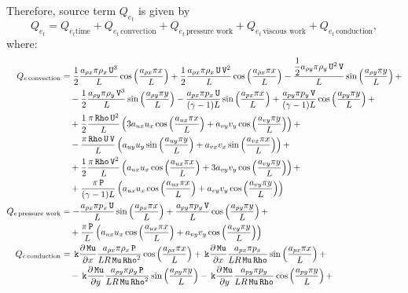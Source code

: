 \documentclass[10pt]{article}
\newcommand{\diff}[2] {\dfrac{\partial #1}{\partial #2}}
\newcommand{\Rho}{\,\mathtt{Rho}}
\newcommand{\PP}{\,\mathtt{P}}
\newcommand{\U}{\,\mathtt{U}}
\newcommand{\V}{\,\mathtt{V}}
\newcommand{\Mu}{\,\mathtt{Mu}}
\newcommand{\DMuDx}{\diff{\Mu}{x}}
\newcommand{\DMuDy}{\diff{\Mu}{y}}
\newcommand{\kk}{\,\mathtt{k}}
\newcommand{\convection}{\,\text{convection}}
\newcommand{\conduction}{\,\text{conduction}}
\newcommand{\workpressure}{\,\text{pressure work}}
\newcommand{\workviscous}{\,\text{viscous work}}
\begin{document}
Therefore, source term $Q_{e_t}$ is given by
$$Q_{e_t} = Q_{e_t \text{time}} + Q_{e_t \convection} + Q_{e_t \workpressure}+ Q_{e_t \workviscous} + Q_{e_t \conduction}, $$
where:
\begin{equation*}
\begin{split}
 Q_{e \convection} &= \dfrac{1}{2} \dfrac{a_{\rho x} \pi \rho_x \U^3 }{L} \cos\left(\dfrac{a_{\rho x} \pi x}{L}\right)+ \dfrac{1}{2} \dfrac{a_{\rho x} \pi \rho_x \U \V^2 }{L}\cos\left(\dfrac{a_{\rho x} \pi x}{L}\right)- \dfrac{\dfrac{1}{2} a_{\rho y} \pi \rho_y \U^2 \V}{L} \sin\left(\dfrac{a_{\rho y} \pi y}{L}\right)+\\
	&\quad-\dfrac{1}{2} \dfrac{a_{\rho y} \pi \rho_y \V^3 }{L}\sin\left(\dfrac{a_{\rho y} \pi y}{L}\right)-\dfrac{a_{px} \pi p_x \U }{(\gamma-1) L}\sin\left(\dfrac{a_{px} \pi x}{L}\right) +\dfrac{a_{py} \pi p_y \V }{(\gamma-1) L}\cos\left(\dfrac{a_{py} \pi y}{L}\right) +\\
	&\quad+\dfrac{1}{2} \dfrac{\pi \Rho \U^2}{L} \left(3 a_{ux} u_x \cos\left(\dfrac{a_{ux} \pi x}{L}\right)+a_{vy} v_y \cos\left(\dfrac{a_{vy} \pi y}{L}\right)\right) +\\
	&\quad-\dfrac{\pi \Rho \U \V}{L}\left(a_{uy} u_y \sin\left(\dfrac{a_{uy} \pi y}{L}\right)+a_{vx} v_x \sin\left(\dfrac{a_{vx} \pi x}{L}\right)\right) +\\
	&\quad+\dfrac{1}{2} \dfrac{\pi \Rho \V^2}{L}\left(a_{ux} u_x \cos\left(\dfrac{a_{ux} \pi x}{L}\right)+3 a_{vy} v_y \cos\left(\dfrac{a_{vy} \pi y}{L}\right)\right) +\\
	&\quad+\dfrac{\pi \PP}{(\gamma-1) L}\left(a_{ux} u_x \cos\left(\dfrac{a_{ux} \pi x}{L}\right)+a_{vy} v_y \cos\left(\dfrac{a_{vy} \pi y}{L}\right)\right)  \\ \vspace{15pt}
%
Q_{e \workpressure} &= -\dfrac{a_{px} \pi p_x \U }{L}\sin\left(\dfrac{a_{px} \pi x}{L}\right) +\dfrac{a_{py} \pi p_y \V }{L}\cos\left(\dfrac{a_{py} \pi y}{L}\right)  +\\
	&\quad+ \dfrac{\pi \PP}{L}\left(a_{ux} u_x \cos\left(\dfrac{a_{ux} \pi x}{L}\right)+a_{vy} v_y \cos\left(\dfrac{a_{vy} \pi y}{L}\right)\right) \\ \vspace{15pt}
%
%
Q_{e \conduction} &= \kk \DMuDx \dfrac{a_{\rho x} \pi \rho_x \PP }{L R \Mu \Rho^2}\cos\left(\dfrac{a_{\rho x} \pi x}{L}\right)  +\kk \DMuDx \dfrac{a_{px} \pi p_x }{L R \Mu \Rho}\sin\left(\dfrac{a_{px} \pi x}{L}\right)+\\
	&\quad-\kk \DMuDy \dfrac{a_{\rho y} \pi \rho_y \PP  }{L R \Mu \Rho^2}\sin\left(\dfrac{a_{\rho y} \pi y}{L}\right) -\kk \DMuDy \dfrac{a_{py} \pi p_y}{L R \Mu \Rho}\cos\left(\dfrac{a_{py} \pi y}{L}\right)+\\

\end{split}
\end{equation*}
\end{document}

